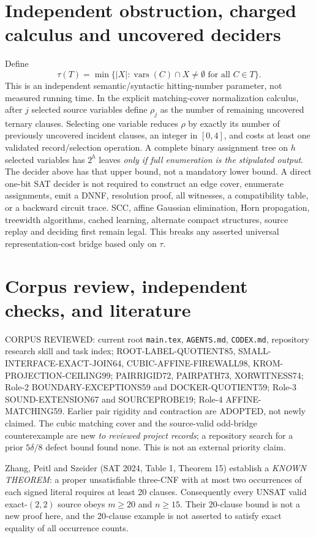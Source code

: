 \documentclass[11pt]{article}
\begin{document}
\section{Independent obstruction, charged calculus and uncovered deciders}
Define
\[
\tau(T)=\min\{|X|:\operatorname{vars}(C)\cap X\ne\emptyset
\text{ for all } C\in T\}.
\]
This is an independent semantic/syntactic hitting-number parameter, not measured running time. In the explicit matching-cover normalization calculus, after $j$ selected source variables define $\rho_j$ as the number of remaining uncovered ternary clauses. Selecting one variable reduces $\rho$ by exactly its number of previously uncovered incident clauses, an integer in $[0,4]$, and costs at least one validated record/selection operation. A complete binary assignment tree on $h$ selected variables has $2^h$ leaves \emph{only if full enumeration is the stipulated output}. The decider above has that upper bound, not a mandatory lower bound. A direct one-bit SAT decider is not required to construct an edge cover, enumerate assignments, emit a DNNF, resolution proof, all witnesses, a compatibility table, or a backward circuit trace. SCC, affine Gaussian elimination, Horn propagation, treewidth algorithms, cached learning, alternate compact structures, source replay and deciding first remain legal. This breaks any asserted universal representation-cost bridge based only on $\tau$.

\section{Corpus review, independent checks, and literature}
CORPUS REVIEWED: current root \texttt{main.tex}, \texttt{AGENTS.md}, \texttt{CODEX.md}, repository research skill and task index; ROOT-LABEL-QUOTIENT85, SMALL-INTERFACE-EXACT-JOIN64, CUBIC-AFFINE-FIREWALL98, KROM-PROJECTION-CEILING99; PAIRRIGID72, PAIRPATH73, XORWITNESS74; Role-2 BOUNDARY-EXCEPTIONS59 and DOCKER-QUOTIENT59; Role-3 SOUND-EXTENSION67 and SOURCEPROBE19; Role-4 AFFINE-MATCHING59. Earlier pair rigidity and contraction are ADOPTED, not newly claimed. The cubic matching cover and the source-valid odd-bridge counterexample are new \emph{to reviewed project records}; a repository search for a prior $5\delta/8$ defect bound found none. This is not an external priority claim.

Zhang, Peitl and Szeider (SAT 2024, Table 1, Theorem 15) establish a \emph{KNOWN THEOREM}: a proper unsatisfiable three-CNF with at most two occurrences of each signed literal requires at least 20 clauses. Consequently every UNSAT valid exact-$(2,2)$ source obeys $m\ge20$ and $n\ge15$. Their 20-clause bound is not a new proof here, and the 20-clause example is not asserted to satisfy exact equality of all occurrence counts.
\end{document}
